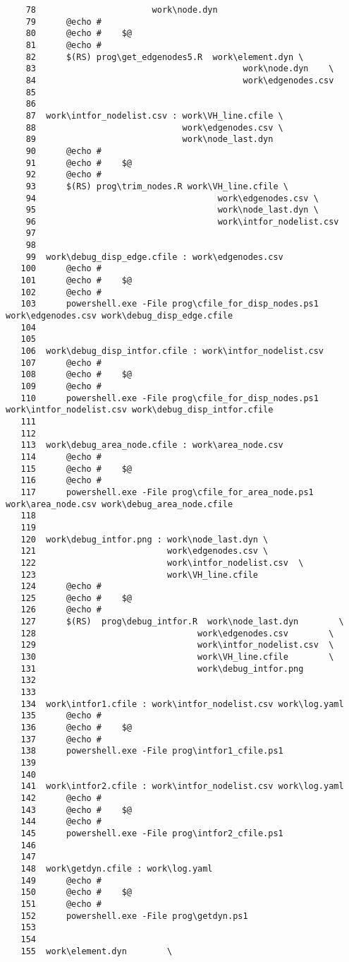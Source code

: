 \documentclass[dvipdfmx]{jsarticle}
\begin{document}
\begin{verbatim}
    78	                     work\node.dyn
    79		@echo #
    80		@echo #    $@
    81		@echo #
    82		$(RS) prog\get_edgenodes5.R  work\element.dyn \
    83	                                       work\node.dyn    \
    84	                                       work\edgenodes.csv
    85	
    86	
    87	work\intfor_nodelist.csv : work\VH_line.cfile \
    88	                           work\edgenodes.csv \
    89	                           work\node_last.dyn
    90		@echo #
    91		@echo #    $@
    92		@echo #
    93		$(RS) prog\trim_nodes.R work\VH_line.cfile \
    94	                                  work\edgenodes.csv \
    95	                                  work\node_last.dyn \
    96	                                  work\intfor_nodelist.csv
    97	
    98	
    99	work\debug_disp_edge.cfile : work\edgenodes.csv
   100		@echo #
   101		@echo #    $@
   102		@echo #
   103		powershell.exe -File prog\cfile_for_disp_nodes.ps1 work\edgenodes.csv work\debug_disp_edge.cfile
   104	
   105	
   106	work\debug_disp_intfor.cfile : work\intfor_nodelist.csv
   107		@echo #
   108		@echo #    $@
   109		@echo #
   110		powershell.exe -File prog\cfile_for_disp_nodes.ps1 work\intfor_nodelist.csv work\debug_disp_intfor.cfile
   111	
   112	
   113	work\debug_area_node.cfile : work\area_node.csv
   114		@echo #
   115		@echo #    $@
   116		@echo #
   117		powershell.exe -File prog\cfile_for_area_node.ps1 work\area_node.csv work\debug_area_node.cfile
   118	
   119	
   120	work\debug_intfor.png : work\node_last.dyn \
   121	                        work\edgenodes.csv \
   122	                        work\intfor_nodelist.csv  \
   123							work\VH_line.cfile
   124		@echo #
   125		@echo #    $@
   126		@echo #
   127		$(RS)  prog\debug_intfor.R  work\node_last.dyn        \
   128	                              work\edgenodes.csv        \
   129	                              work\intfor_nodelist.csv  \
   130	                              work\VH_line.cfile        \
   131	                              work\debug_intfor.png
   132	
   133	
   134	work\intfor1.cfile : work\intfor_nodelist.csv work\log.yaml
   135		@echo #
   136		@echo #    $@
   137		@echo #
   138		powershell.exe -File prog\intfor1_cfile.ps1
   139	
   140	
   141	work\intfor2.cfile : work\intfor_nodelist.csv work\log.yaml
   142		@echo #
   143		@echo #    $@
   144		@echo #
   145		powershell.exe -File prog\intfor2_cfile.ps1
   146	
   147	
   148	work\getdyn.cfile : work\log.yaml
   149		@echo #
   150		@echo #    $@
   151		@echo #
   152		powershell.exe -File prog\getdyn.ps1
   153	
   154	
   155	work\element.dyn        \

\end{verbatim}
\end{document}
